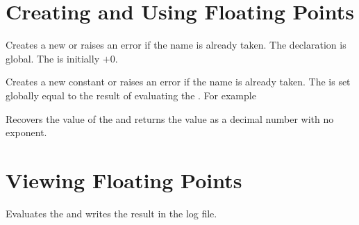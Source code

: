 \documentclass[oneside]{book}
\begin{document}
\section{Creating and Using Floating Points}

\begin{function}{\FpNew}
\begin{syntax}
 
\end{syntax}
Creates a new  or raises an error if the name is
already taken. The declaration is global. The  is
initially $+0$.
\end{function}

\begin{function}{\FpConst}
\begin{syntax}
  
\end{syntax}
Creates a new constant  or raises an error if the name
is already taken. The  is set globally equal to
the result of evaluating the .
For example
\begin{demohigh}
\FpConst {}
\FpUse \cMyPiFp
\end{demohigh}
\end{function}

\begin{function}{\FpUse}
\begin{syntax}
 
\end{syntax}
Recovers the value of the  and returns the value as a
decimal number with no exponent.
\end{function}

\section{Viewing Floating Points}

\begin{function}{\FpLog}
\begin{syntax}
 
\end{syntax}
Evaluates the  and writes the
result in the log file.
\end{function}
\end{document}
